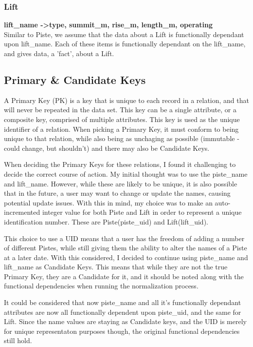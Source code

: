 \documentclass[11pt]{scrartcl} %
\begin{document}
\subsubsection{Lift}
\textbf{lift\_name -\textgreater  type, summit\_m, rise\_m, length\_m, operating}
\\[0.2cm]
Similar to Piste, we assume that the data about a Lift is functionally dependant upon lift\_name. Each of these items is functionally dependant on the lift\_name, and gives data, a 'fact', about a Lift.

\subsection{Primary \& Candidate Keys}
A Primary Key (PK) is a key that is unique to each record in a relation, and that will never be repeated in the data set. This key can be a single attribute, or a composite key, comprised of multiple attributes. This key is used as the unique identifier of a relation. When picking a Primary Key, it must conform to being unique to that relation, while also being as unchaging as possible (immutable - could change, but shouldn't) and there may also be Candidate Keys.

When deciding the Primary Keys for these relations, I found it challenging to decide the correct course of action. My initial thought was to use the piste\_name and lift\_name. However, while these are likely to be unique, it is also possible that in the future, a user may want to change or update the names, causing potential update issues. With this in mind, my choice was to make an auto-incremented integer value for both Piste and Lift in order to represent a unique identification number. These are Piste(piste\_uid) and Lift(lift\_uid).

This choice to use a UID means that a user has the freedom of adding a number of different Pistes, while still giving them the ability to alter the names of a Piste at a later date. With this considered, I decided to continue using piste\_name and lift\_name as Candidate Keys. This means that while they are not the true Primary Key, they are a Candidate for it, and it should be noted along with the functional dependencies when running the normalization process.

 It could be considered that now piste\_name and all it's functionally dependant attributes are now all functionally dependent upon piste\_uid, and the same for Lift. Since the name values are staying as Candidate keys, and the UID is merely for unique representaton purposes though, the original functional dependencies still hold.
\end{document}

